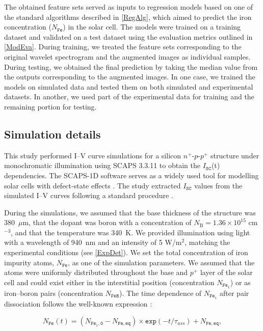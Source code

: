 \documentclass[10pt]{iopart}
\begin{document}
The obtained feature sets served as inputs to regression models based on one of the standard algorithms described in \ref{RegAlg}, which aimed to predict the iron concentration ($N_\mathtt{Fe}$) in the solar cell. 
The models were trained on a training dataset and validated on a test dataset using the evaluation metrics outlined in \ref{ModEva}.
During training, we treated the feature sets corresponding to the original wavelet spectrogram and the augmented images as individual samples. During testing, we obtained the final prediction by taking the median value from the outputs corresponding to the augmented images.
In one case, we trained the models on simulated data and tested them on both simulated and experimental datasets. In another, we used part of the experimental data for training and the remaining portion for testing.

\subsection{Simulation details}\label{subsec:SimDet}

This study performed I–V curve simulations for a silicon $n^+$-$p$-$p^+$ structure under monochromatic illumination using SCAPS 3.3.11 to obtain the $I_\mathtt{SC}$(t) dependencies. 
The SCAPS-1D software \cite{SCAPS1} serves as a widely used tool for modelling solar cells with defect-state effects \cite{MasumMia2025, Joshi2024, Ravidas2024, Liu2024, You2023, SCAPSDefect3}. 
The study extracted $I_\mathtt{SC}$ values from the simulated I–V curves following a standard procedure \cite{SCparam2017}.


During the simulations, we assumed that the base thickness of the structure was 380~$\mu$m, that the dopant was boron with a concentration of $N_\mathrm{B} = 1.36 \times 10^{15}$ cm$^{-3}$, and that the temperature was 340~K. 
We provided illumination using light with a wavelength of 940~nm and an intensity of 5 W/m$^{2}$, matching the experimental conditions (see \ref{ExpDet}).
We set the total concentration of iron impurity atoms, $N_\mathtt{Fe}$, as one of the simulation parameters. 
We assumed that the atoms were uniformly distributed throughout the base and $p^+$ layer of the solar cell and could exist either in the interstitial position (concentration $N_\mathtt{Fe_i}$) or as iron–boron pairs (concentration $N_\mathtt{FeB}$). 
The time dependence of $N_\mathtt{Fe_i}$ after pair dissociation follows the well-known expression \cite{MurphyJAP2011, Wijaranakula}:

\begin{equation}\label{eqNFet}
  N_\mathtt{Fe}(t)=(N_\mathtt{Fe_i,0}-N_\mathtt{Fe,eq}) \times \mathtt{exp}({-t/\tau_{ass}})+N_\mathtt{Fe,eq},
\end{equation}
\end{document}
